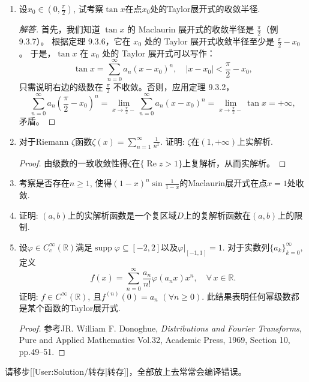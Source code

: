 \begin{quizb}
\begin{enumerate}
\begin{proof}
用反证法，假设 \(\sum_{n=0}^{\infty} a_n(-1)^n\) 收敛，那么当 $n$ 足够大时，$|a_n|<1$。于是，
\[\sum_{n=0}^{\infty} \frac{a_n}{(n+1)(n+2)}<\infty,\]
和条件矛盾。
\end{proof}
\item 设\(x_0\in\left(0,\frac{\pi}{2}\right)\), 
试考察\(\tan x\)在点\(x_0\)处的Taylor展开式的收敛半径.
\begin{proof}[解答]
首先，我们知道 $\tan x$ 的 Maclaurin 展开式的收敛半径是 \(\frac{\pi}{2}\)（例 9.3.7）。
根据定理 9.3.6，它在 $x_0$ 处的 Taylor 展开式收敛半径至少是 \(\frac{\pi}{2}-x_0\)。
于是，$\tan x$ 在 $x_0$ 处的 Taylor 展开式可以写作：
\[\tan x=\sum_{n=0}^{\infty} a_n(x-x_0)^n, \quad|x-x_0|<\frac{\pi}{2}-x_0,\]
只需说明右边的级数在 \(\frac{\pi}{2}\) 不收敛。否则，应用定理 9.3.2，
\[\sum_{n=0}^{\infty} a_n\left(\frac{\pi}{2}-x_0\right)^n
=\lim_{x \rightarrow \frac{\pi}{2}-} \sum_{n=0}^{\infty} a_n(x-x_0)^n
=\lim_{x \rightarrow \frac{\pi}{2}-} \tan x=+\infty,\]
矛盾。
\end{proof}
\item 对于Riemann \(\zeta\)函数\(\zeta(x)=\sum_{n=1}^{\infty}\frac{1}{n^x}\). 
证明: \(\zeta\)在\((1,+\infty)\)上实解析.
\begin{proof}
    由级数的一致收敛性得$\zeta$在$\{\operatorname{Re}z>1\}$上复解析，从而实解析。
\end{proof}
\item 考察是否存在\(n\geqslant 1\), 使得\((1-x)^n\sin\frac{1}{1-x}\)的Maclaurin展开式在点\(x=1\)处收敛.
\item 证明: \((a,b)\)上的实解析函数是一个复区域\(D\)上的复解析函数在\((a,b)\)上的限制.
\item 设\(\varphi\in C_c^{\infty}(\mathbb{R})\)满足\(\operatorname{supp}\varphi\subseteq [-2,2]\)以及\(\varphi\big|_{[-1,1]}=1\). 
对于实数列\(\{a_k\}_{k=0}^{\infty}\), 定义
\[f(x)=\sum_{n=0}^{\infty}\frac{a_n}{n!}\varphi(a_nx)x^n,\quad\forall\, x\in\mathbb{R}.\]
证明: \(f\in C^{\infty}(\mathbb{R})\), 且\(f^{(n)}(0)=a_n\) \((\forall n\geqslant 0)\). 
此结果表明任何幂级数都是某个函数的Taylor展开式.
\begin{proof}
参考JR. William F. Donoghue, \textit{Distributions and Fourier Transforms}, 
Pure and Applied Mathematics Vol.32, Academic Press, 1969, Section 10, pp.49--51.
\end{proof}
\end{enumerate}
\end{quizb}

请移步[[User:Solution/转存|转存]]，全部放上去常常会编译错误。